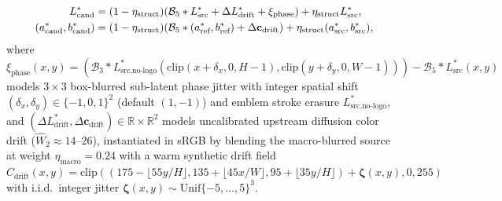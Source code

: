 \documentclass[conference,10pt]{IEEEtran}
\begin{document}
\begin{equation}
\label{eq:candidate_generator}
\resizebox{0.89\columnwidth}{!}{$\displaystyle
\begin{aligned}
L^*_{\text{cand}} &= (1 - \eta_{\text{struct}}) (\mathcal{B}_5 * L^*_{\text{src}} + \Delta L^*_{\text{drift}} + \xi_{\text{phase}}) + \eta_{\text{struct}} L^*_{\text{src}}, \\
(a^*_{\text{cand}}, b^*_{\text{cand}}) &= (1 - \eta_{\text{struct}}) (\mathcal{B}_5 * (a^*_{\text{ref}}, b^*_{\text{ref}}) + \Delta \mathbf{c}_{\text{drift}}) + \eta_{\text{struct}} (a^*_{\text{src}}, b^*_{\text{src}}),
\end{aligned}
$}
\end{equation}
where $\xi_{\text{phase}}(x,y) = (\mathcal{B}_3 * L^*_{\text{src},\text{no-logo}}(\mathrm{clip}(x+\delta_x,0,H-1), \mathrm{clip}(y+\delta_y,0,W-1))) - \mathcal{B}_5 * L^*_{\text{src}}(x,y)$ models $3\times 3$ box-blurred sub-latent phase jitter with integer spatial shift $(\delta_x, \delta_y) \in \{-1, 0, 1\}^2$ (default $(1, -1)$) and emblem stroke erasure $L^*_{\text{src},\text{no-logo}}$, and $(\Delta L^*_{\text{drift}}, \Delta \mathbf{c}_{\text{drift}}) \in \mathbb{R} \times \mathbb{R}^2$ models uncalibrated upstream diffusion color drift ($\widehat{W}_2 \approx 14\text{--}26$), instantiated in sRGB by blending the macro-blurred source at weight $\eta_{\text{macro}} = 0.24$ with a warm synthetic drift field $C_{\text{drift}}(x,y) = \mathrm{clip}((175 - \lfloor 55 y/H \rfloor, 135 + \lfloor 45 x/W \rfloor, 95 + \lfloor 35 y/H \rfloor) + \boldsymbol{\zeta}(x,y), 0, 255)$ with i.i.d.\ integer jitter $\boldsymbol{\zeta}(x,y) \sim \mathrm{Unif}\{-5, \dots, 5\}^3$.
\end{document}
